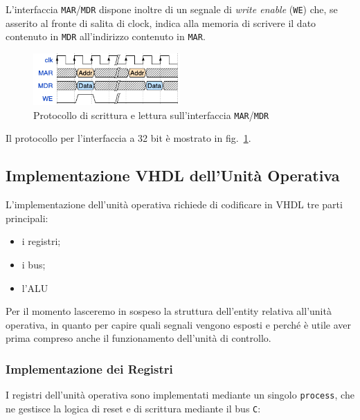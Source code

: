 \documentclass[a4paper,12pt]{scrreprt}
\begin{document}
L'interfaccia \lstinline{MAR}/\lstinline{MDR} dispone inoltre di un segnale di
\textit{write enable} (\lstinline{WE}) che, se asserito al fronte di salita di
clock, indica alla memoria di scrivere il dato contenuto in \lstinline{MDR}
all'indirizzo contenuto in \lstinline{MAR}.

\begin{figure}
  \centering
  \includegraphics[width=0.5\textwidth]{mem_prot.png}
  \caption{Protocollo di scrittura e lettura sull'interfaccia
    \lstinline{MAR}/\lstinline{MDR}}\label{fig:mem_prot}
\end{figure}

Il protocollo per l'interfaccia a 32 bit è mostrato in fig.~\ref{fig:mem_prot}.

\subsection{Implementazione VHDL dell'Unità Operativa}

L'implementazione dell'unità operativa richiede di codificare in VHDL tre
parti principali:
\begin{itemize}
  \item i registri;
  \item i bus;
  \item l'ALU
\end{itemize}

\begin{mynote}{}{}
  Per il momento lasceremo in sospeso la struttura dell'entity relativa
  all'unità operativa, in quanto per capire quali segnali vengono esposti e
  perché è utile aver prima compreso anche il funzionamento dell'unità di
  controllo.
\end{mynote}

\subsubsection{Implementazione dei Registri}

I registri dell'unità operativa sono implementati mediante un singolo
\lstinline{process}, che ne gestisce la logica di reset e di scrittura mediante
il bus \lstinline{C}:
\end{document}
